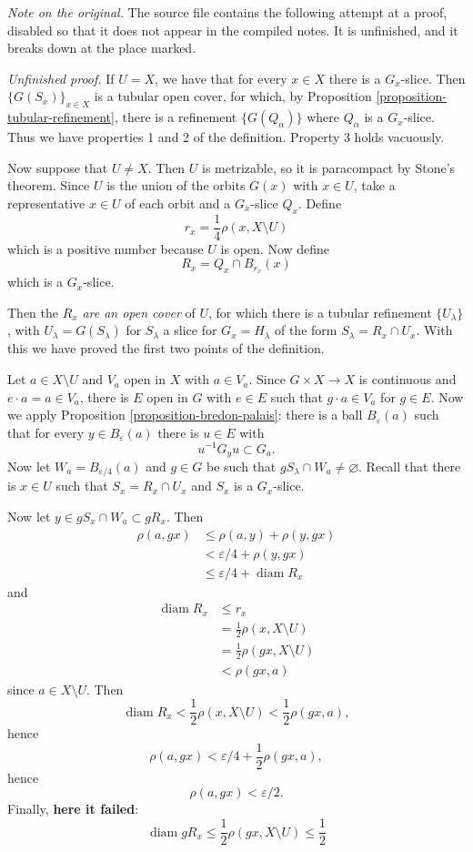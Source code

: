 \noindent
{\it Note on the original.} The source
file contains the following attempt at
a proof, disabled so that it does not
appear in the compiled notes. It is
unfinished, and it breaks down at the
place marked.

\medskip\noindent
{\it Unfinished proof.} If $U=X$, we
have that for every $x\in X$ there is a
$G_x$-slice. Then
$\{G(S_x)\}_{x\in X}$ is a tubular open
cover, for which, by
Proposition
\ref{proposition-tubular-refinement},
there is a refinement
$\{G(Q_\alpha)\}$ where $Q_\alpha$ is a
$G_x$-slice. Thus we have properties 1
and 2 of the definition. Property 3
holds vacuously.

Now suppose that $U\neq X$. Then $U$ is
metrizable, so it is paracompact by
Stone's theorem. Since $U$ is the union
of the orbits $G(x)$ with $x\in U$,
take a representative $x\in U$ of each
orbit and a $G_x$-slice $Q_x$. Define
$$
r_x=\frac{1}{4}
\rho(x,X\setminus U)
$$
which is a positive number because $U$
is open. Now define
$$
R_x=Q_x\cap B_{r_x}(x)
$$
which is a $G_x$-slice.

Then the $R_x$ {\it are an open cover}
of $U$, for which there is a tubular
refinement $\{U_\lambda\}$, with
$U_\lambda=G(S_\lambda)$ for
$S_\lambda$ a slice for
$G_x=H_\lambda$ of the form
$S_\lambda=R_x\cap U_x$. With this we
have proved the first two points of the
definition.

Let $a\in X\setminus U$ and $V_a$ open
in $X$ with $a\in V_a$. Since
$G\times X\to X$ is continuous and
$e\cdot a=a\in V_a$, there is $E$ open
in $G$ with $e\in E$ such that
$g\cdot a\in V_a$ for $g\in E$. Now we
apply
Proposition
\ref{proposition-bredon-palais}: there
is a ball $B_\varepsilon(a)$ such that
for every $y\in B_\varepsilon(a)$ there
is $u\in E$ with
$$
u^{-1}G_yu\subset G_a.
$$
Now let $W_a=B_{\varepsilon/4}(a)$ and
$g\in G$ be such that
$gS_\lambda\cap W_a\neq\varnothing$.
Recall that there is $x\in U$ such that
$S_x=R_x\cap U_x$ and $S_x$ is a
$G_x$-slice.

Now let
$y\in gS_x\cap W_a\subset gR_x$. Then
$$
\begin{aligned}
\rho(a,gx)
&\leq\rho(a,y)+\rho(y,gx) \\
&<\varepsilon/4+\rho(y,gx) \\
&\leq\varepsilon/4
 +\operatorname{diam}R_x
\end{aligned}
$$
and
$$
\begin{aligned}
\operatorname{diam}R_x
&\leq r_x \\
&=\frac{1}{2}\rho(x,X\setminus U) \\
&=\frac{1}{2}\rho(gx,X\setminus U) \\
&<\rho(gx,a)
\end{aligned}
$$
since $a\in X\setminus U$. Then
$$
\operatorname{diam}R_x
<\frac{1}{2}\rho(x,X\setminus U)
<\frac{1}{2}\rho(gx,a),
$$
hence
$$
\rho(a,gx)
<\varepsilon/4
+\frac{1}{2}\rho(gx,a),
$$
hence
$$
\rho(a,gx)<\varepsilon/2.
$$
Finally, {\bf here it failed}:
$$
\operatorname{diam}gR_x
\leq\frac{1}{2}
\rho(gx,X\setminus U)
\leq\frac{1}{2}
$$

